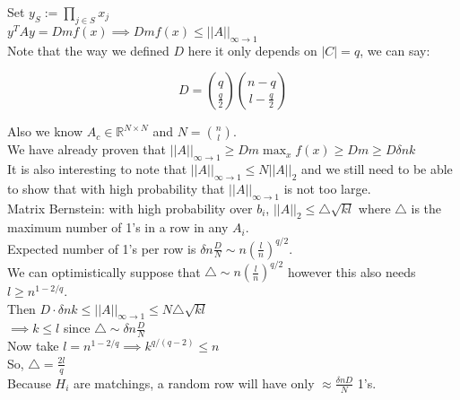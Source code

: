 \documentclass{article}
\begin{document}
\noindent Set $y_S := \displaystyle\prod_{j \in S} x_j$\\

\noindent $y^TAy = Dmf(x) \implies Dmf(x) \leq ||A||_{\infty \to 1}$\\

\noindent Note that the way we defined $D$ here it only depends on $|C| = q$, we can say:

\begin{equation*}
D = {q \choose \frac{q}{2}} {n-q \choose l - \frac{q}{2}}
\end{equation*}

\noindent Also we know $A_c \in \mathbb{R}^{N \times N}$ and $N = {n \choose l}$.\\

\noindent We have already proven that $||A||_{\infty \to 1} \geq Dm \max_{x}f(x) \geq Dm \geq D \delta nk$\\

\noindent It is also interesting to note that $||A||_{\infty \to 1} \leq N ||A||_2$ and we still need to be able to show that with high probability that $||A||_{\infty \to 1}$ is not too large.\\

\noindent Matrix Bernstein: with high probability over $b_i$, $||A||_2 \leq \triangle \sqrt{kl}$ where $\triangle$ is the maximum number of 1's in a row in any $A_i$.\\

\noindent Expected number of 1's per row is $\delta n \frac{D}{N} \sim n (\frac{l}{n})^{q/2}$.\\

\noindent We can optimistically suppose that $\triangle \sim n (\frac{l}{n})^{q/2}$ however this also needs $l \geq n^{1-2/q}$.\\

\noindent Then $D \cdot \delta n k \leq ||A||_{\infty \to  1} \leq N \triangle \sqrt{kl}$\\

\noindent $\implies k \leq l$ since $\triangle \sim \delta n \frac{D}{N}$\\

\noindent Now take $l=n^{1-2/q} \implies k^{q/(q-2)} \leq n$\\

\noindent So, $\triangle =\frac{2l}{q}$\\

\noindent Because $H_i$ are matchings, a random row will have only $\approx \frac{\delta n D}{N}$ 1's.\\
\end{document}
